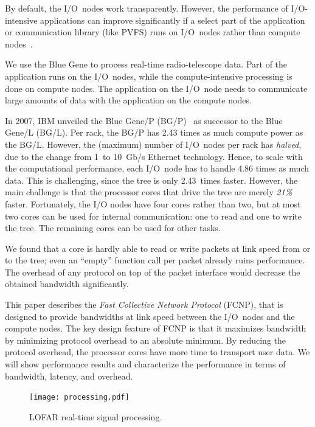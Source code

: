 \documentclass[conference]{worldcomp}
\begin{document}
By default, the I/O~nodes work transparently.
However, the performance of I/O-intensive applications can improve
significantly if a select part of the application or communication library
(like PVFS) runs on I/O~nodes rather than compute nodes~\cite{Iskra:08}.

We use the Blue Gene to process real-time radio-telescope data.
Part of the application runs on the I/O~nodes, while the compute-intensive
processing is done on compute nodes.
The application on the I/O~node needs to communicate large amounts of data
with the application on the compute nodes.

In 2007, IBM unveiled the Blue Gene/P (BG/P)~\cite{IBM:08} as successor to
the Blue Gene/L (BG/L).
Per rack, the BG/P has 2.43 times as much compute power as the BG/L.
However, the (maximum) number of I/O~nodes per rack has \emph{halved}, due to
the change from 1~to 10~Gb/s Ethernet technology.
Hence, to scale with the computational performance, each I/O~node has to
handle 4.86 times as much data.
This is challenging, since the tree is only 2.43~times faster.
However, the main challenge is that the processor cores that drive the tree
are merely \emph{21\%\/} faster.
Fortunately, the I/O nodes have four cores rather than two, but at most two
cores can be used for internal communication: one to read and one to write the
tree.
The remaining cores can be used for other tasks.

We found that a core is hardly able to read or write packets at
link speed from or to the tree; even an ``empty'' function call per packet
already ruins performance.
The overhead of any protocol on top of the packet interface would decrease
the obtained bandwidth significantly.


This paper describes the \emph{Fast Collective Network Protocol\/} (FCNP),
that is designed to provide bandwidths at link speed between the I/O~nodes
and the compute nodes.
The key design feature of FCNP is that it maximizes bandwidth by minimizing
protocol overhead to an absolute minimum.
By reducing the protocol overhead, the processor cores have more time to
transport user data.
We will show performance results and characterize the performance in terms
of bandwidth, latency, and overhead.

\addtocounter{figure}{1}
\begin{figure}[t]
\texttt{[image: processing.pdf]}
\caption{LOFAR real-time signal processing.}
\label{fig:processing}
\end{figure}
\end{document}
